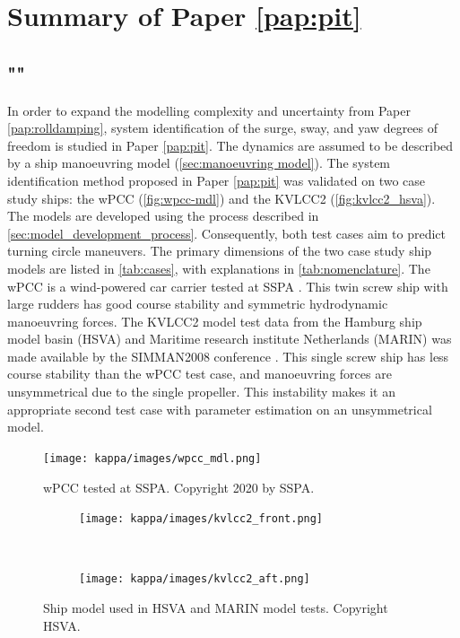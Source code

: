 \section{Summary of Paper \ref{pap:pit}}
\subsection*{""}
In order to expand the modelling complexity and uncertainty from Paper \ref{pap:rolldamping}, system identification of the surge, sway, and yaw degrees of freedom is studied in Paper \ref{pap:pit}. The dynamics are assumed to be described by a ship manoeuvring model (\autoref{sec:manoeuvring model}). The system identification method proposed in Paper \ref{pap:pit} was validated on two case study ships: the wPCC (\autoref{fig:wpcc-mdl}) and the KVLCC2 (\autoref{fig:kvlcc2_hsva}). The models are developed using the process described in \autoref{sec:model_development_process}. Consequently, both test cases aim to predict turning circle maneuvers. The primary dimensions of the two case study ship models are listed in \autoref{tab:cases}, with explanations in \autoref{tab:nomenclature}. The wPCC is a wind-powered car carrier tested at SSPA \cite{alexandersson_wpcc_2022}. This twin screw ship with large rudders has good course stability and symmetric hydrodynamic manoeuvring forces. The KVLCC2 model test data from the Hamburg ship model basin (HSVA) and Maritime research institute Netherlands (MARIN) was made available by the SIMMAN2008 conference \cite{stern_experience_2011}. This single screw ship has less course stability than the wPCC test case, and manoeuvring forces are unsymmetrical due to the single propeller. This instability makes it an appropriate second test case with parameter estimation on an unsymmetrical model.

\begin{figure}[h!]
\centering
\texttt{[image: kappa/images/wpcc\_mdl.png]}
\caption{wPCC tested at SSPA. Copyright 2020 by SSPA.}
\label{fig:wpcc-mdl}
\end{figure}

\begin{figure}[h!]
    \centering
    \begin{subfigure}[b]{0.45\textwidth}
    \centering
    \texttt{[image: kappa/images/kvlcc2\_front.png]}
    \end{subfigure}
    ~
     \begin{subfigure}[b]{0.45\textwidth}
     \centering
     \texttt{[image: kappa/images/kvlcc2\_aft.png]}
     \end{subfigure}
    \caption{Ship model used in HSVA and MARIN model tests. Copyright HSVA.}
    \label{fig:kvlcc2_hsva}
\end{figure}


